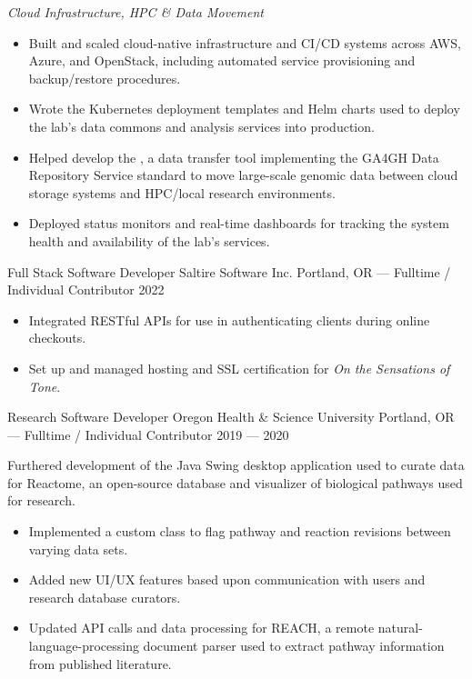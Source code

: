 \vspace{0.4em}

\emph{Cloud Infrastructure, HPC \& Data Movement}

\begin{itemize}
    \item Built and scaled cloud-native infrastructure and CI/CD systems across AWS, Azure, and OpenStack, including automated service provisioning and backup/restore procedures.
    \item Wrote the Kubernetes deployment templates and Helm charts used to deploy the lab's data commons and analysis services into production.
    \item Helped develop the , a data transfer tool implementing the GA4GH Data Repository Service standard to move large-scale genomic data between cloud storage systems and HPC/local research environments.
    \item Deployed status monitors and real-time dashboards for tracking the system health and availability of the lab's services.
\end{itemize}

\newpage

\showoff
{Full Stack Software Developer}
{Saltire Software Inc.}
{Portland, OR --- Fulltime / Individual Contributor}
{2022}

\begin{itemize}
    \item Integrated RESTful APIs for use in authenticating clients during online checkouts.
    \item Set up and managed hosting and SSL certification for \emph{On the Sensations of Tone}.
\end{itemize}

\vspace*{\baselineskip}

\showoff
{Research Software Developer}
{Oregon Health \& Science University}
{Portland, OR --- Fulltime / Individual Contributor}
{2019 --- 2020}

Furthered development of the Java Swing desktop application used to curate data for Reactome, an open-source database and visualizer of biological pathways used for research.

\begin{itemize}
    \item Implemented a custom class to flag pathway and reaction revisions between varying data sets.
    \item Added new UI/UX features based upon communication with users and research database curators.
    \item Updated API calls and data processing for REACH, a remote natural-language-processing document parser used to extract pathway information from published literature.
\end{itemize}





\vfill \myBreak{}


